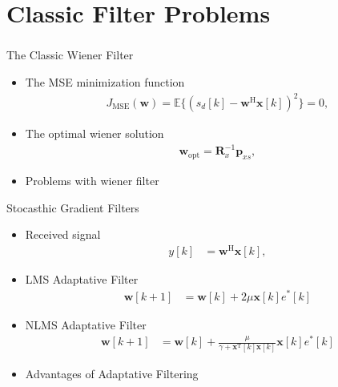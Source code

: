 \documentclass[10pt]{beamer}
\begin{document}
\section{Classic Filter Problems}
\begin{frame}[allowframebreaks]
    \frametitle{\insertsection}
    \begin{block}{The Classic Wiener Filter}
        \begin{itemize}
            \item The MSE minimization function
            \begin{align}
                J_{\text{MSE}}(\boldsymbol{w}) = \mathbb{E}\{ (s_{d}[k] - \boldsymbol{w}^{\text{H}} \boldsymbol{x}[k] )^{2} \} = 0,
            \end{align}
            \item The optimal wiener solution
            \begin{align}
                \boldsymbol{w}_{\text{opt}} = \boldsymbol{R}^{-1}_{x} \boldsymbol{p}_{xs},   
            \end{align}
            \item Problems with wiener filter
        \end{itemize}
    \end{block} 
    \framebreak
    \begin{block}{Stocasthic Gradient Filters}
        \begin{itemize}
            \item Received signal
            \begin{align}
                y[k] &= \boldsymbol{w}^{\text{H}} \boldsymbol{x}[k],
            \end{align}
            \item LMS Adaptative Filter
            \begin{align}
                \boldsymbol{w}[k+1] &= \boldsymbol{w}[k] + 2 \mu \boldsymbol{x}[k] e^{*}[k]
            \end{align}
            \item NLMS Adaptative Filter
            \begin{align}
                \boldsymbol{w}[k+1] &= \boldsymbol{w}[k] + \frac{\mu}{\gamma + \boldsymbol{x}^{\text{T}}[k] \boldsymbol{x}[k]} \boldsymbol{x}[k] e^{*}[k]
            \end{align}
            \item Advantages of Adaptative Filtering
        \end{itemize}
    \end{block} 

\end{frame}
\end{document}
